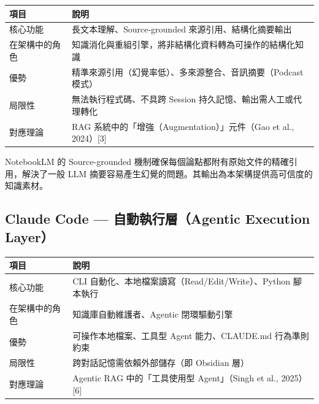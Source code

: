 {\def\LTcaptype{none} %
\begin{longtable}[]{@{}
  >{\raggedright\arraybackslash}p{}
  >{\raggedright\arraybackslash}p{}@{}}
\toprule\noalign{}
\begin{minipage}[b]{\linewidth}\raggedright
項目
\end{minipage} & \begin{minipage}[b]{\linewidth}\raggedright
說明
\end{minipage} \\
\midrule\noalign{}
\endhead
\bottomrule\noalign{}
\endlastfoot
核心功能 & 長文本理解、Source-grounded 來源引用、結構化摘要輸出 \\
在架構中的角色 &
知識消化與重組引擎，將非結構化資料轉為可操作的結構化知識 \\
優勢 & 精準來源引用（幻覺率低）、多來源整合、音訊摘要（Podcast 模式） \\
局限性 & 無法執行程式碼、不具跨 Session
持久記憶、輸出需人工或代理轉化 \\
對應理論 & RAG 系統中的「增強（Augmentation）」元件（Gao et al.,
2024）{[}3{]} \\
\end{longtable}
}

NotebookLM 的 Source-grounded
機制確保每個論點都附有原始文件的精確引用，解決了一般 LLM
摘要容易產生幻覺的問題。其輸出為本架構提供高可信度的知識素材。

\subsection{Claude Code --- 自動執行層（Agentic Execution
Layer）}\label{claude-code-ux81eaux52d5ux57f7ux884cux5c64agentic-execution-layer}

{\def\LTcaptype{none} %
\begin{longtable}[]{@{}
  >{\raggedright\arraybackslash}p{}
  >{\raggedright\arraybackslash}p{}@{}}
\toprule\noalign{}
\begin{minipage}[b]{\linewidth}\raggedright
項目
\end{minipage} & \begin{minipage}[b]{\linewidth}\raggedright
說明
\end{minipage} \\
\midrule\noalign{}
\endhead
\bottomrule\noalign{}
\endlastfoot
核心功能 & CLI 自動化、本地檔案讀寫（Read/Edit/Write）、Python
腳本執行 \\
在架構中的角色 & 知識庫自動維護者、Agentic 閉環驅動引擎 \\
優勢 & 可操作本地檔案、工具型 Agent 能力、CLAUDE.md 行為準則約束 \\
局限性 & 跨對話記憶需依賴外部儲存（即 Obsidian 層） \\
對應理論 & Agentic RAG 中的「工具使用型 Agent」（Singh et al.,
2025）{[}6{]} \\
\end{longtable}
}

